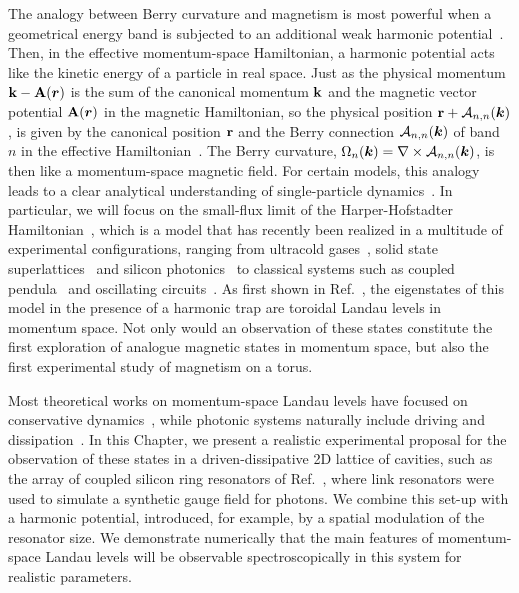 The analogy between Berry curvature and magnetism is most powerful
when a geometrical energy band is subjected to an additional weak
harmonic potential~\cite{price2014magnetic}. Then, in the effective
momentum-space Hamiltonian, a harmonic potential acts like the kinetic
energy of a particle in real space. Just as the physical momentum
$\mathbf{k}-\mathbf{A}(\bm{r})$ is the sum of the canonical momentum $\mathbf{k}$ and
the magnetic vector potential $\mathbf{A} (\bm{r})$ in the magnetic
Hamiltonian, so the physical position $\mathbf{r}+\mathcal{A}_{n,n}(\bm{k})$,
is given by the canonical position $\mathbf{r}$ and the Berry connection
$\mathcal{A}_{n,n}(\bm{k})$ of band $n$ in the effective
Hamiltonian~\cite{adams1959energy,nagaosa,
murakami2003dissipationless, bliokh2005spin, fujita,
bliokh2005topological,gosselin2006semiclassical}. The Berry curvature,
$\Omega_n (\bm{k})= \nabla \times \mathcal{A}_{n,n}(\bm{k})$, is then like a
momentum-space magnetic field. For certain models, this analogy leads
to a clear analytical understanding of single-particle
dynamics~\cite{price2014magnetic, ozawa2014momhh, price2015sporbit,
Claassen_prl_2015}. In particular, we will focus on the small-flux
limit of the Harper-Hofstadter
Hamiltonian~\cite{harper1955magnetic,hofstadter1976butterfly}, which
is a model that has recently been realized in a multitude of
experimental configurations, ranging from ultracold
gases~\cite{aidelsburger2013hh,miyake2013hh,mancini2015edge,stuhl2015edge},
solid state superlattices~\cite{dean2013hofstadter,yu2014hierarchy}
and silicon photonics~\cite{hafezi2013imaging} to classical systems
such as coupled pendula~\cite{susstrunk2015pendula} and oscillating
circuits~\cite{jia2013circuits}. As first shown in
Ref.~\cite{price2014magnetic}, the eigenstates of this model in the
presence of a harmonic trap are toroidal Landau levels in momentum
space. Not only would an observation of these states constitute the
first exploration of analogue magnetic states in momentum space, but
also the first experimental study of magnetism on a torus.
 
Most theoretical works on momentum-space Landau levels have focused on
conservative dynamics~\cite{price2014magnetic, Claassen_prl_2015},
while photonic systems naturally include driving and
dissipation~\cite{carusotto2013fluids}. In this Chapter, we present a
realistic experimental proposal for the observation of these states in
a driven-dissipative 2D lattice of cavities, such as the array of
coupled silicon ring resonators of Ref.~\cite{hafezi2013imaging},
where link resonators were used to simulate a synthetic gauge field
for photons. We combine this set-up with a harmonic potential,
introduced, for example, by a spatial modulation of the resonator
size. We demonstrate numerically that the main features of
momentum-space Landau levels will be observable spectroscopically in
this system for realistic parameters.

